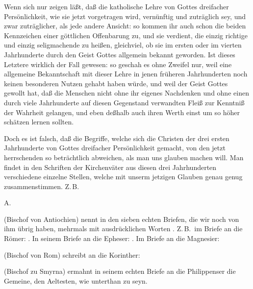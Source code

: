 \begin{aufza}
\item Wenn sich nur zeigen läßt, daß die katholische Lehre von Gottes dreifacher Persönlichkeit, wie sie jetzt vorgetragen wird, vernünftig und zuträglich sey, und zwar zuträglicher, als jede andere Ansicht: so kommen ihr auch schon die beiden Kennzeichen
einer göttlichen Offenbarung zu, und sie verdient, die einzig richtige und einzig seligmachende zu heißen, gleichviel, ob sie im ersten oder im vierten Jahrhunderte durch den Geist Gottes allgemein bekannt geworden. Ist dieses Letztere wirklich der Fall gewesen: so geschah es ohne Zweifel nur, weil eine allgemeine Bekanntschaft mit dieser Lehre in jenen früheren Jahrhunderten noch keinen besonderen Nutzen gehabt haben würde, und weil der Geist Gottes gewollt hat, daß die Menschen nicht ohne ihr eigenes Nachdenken und ohne einen durch viele Jahrhunderte auf diesen Gegenstand verwandten Fleiß zur Kenntniß der Wahrheit gelangen, und eben deßhalb auch ihren Werth einst um so höher schätzen lernen sollten.
\item Doch es ist falsch, daß die Begriffe, welche sich die Christen der drei ersten Jahrhunderte von Gottes dreifacher Persönlichkeit gemacht, von den jetzt herrschenden so beträchtlich abweichen, als man uns glauben machen will. Man findet in den Schriften der Kirchenväter aus diesen drei Jahrhunderten verschiedene einzelne Stellen, welche mit unserm jetzigen Glauben genau genug zusammenstimmen. Z.\,B.~
\end{aufza}\par

\vabst A.~
\begin{aufza}
\item {} (Bischof von Antiochien) nennt in den sieben echten Briefen, die wir noch von ihm übrig haben,  mehrmals mit ausdrücklichen Worten . Z.\,B.\ im Briefe an die Römer: . In seinem Briefe an die Epheser: . Im Briefe an die Magnesier: 
\item {} (Bischof von Rom) schreibt an die Korinther: 
\item {} (Bischof zu Smyrna) ermahnt in seinem echten Briefe an die Philippenser die Gemeine, den Aeltesten, wie  unterthan zu seyn.
\end{aufza}

